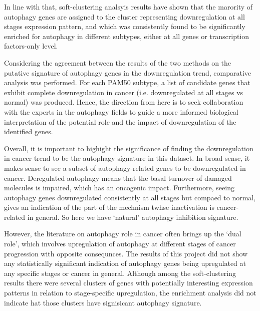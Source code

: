 In line with that, soft-clustering analsyis results have shown that the marority of autophagy genes are assigned to the cluster representing downregulation at all stages expression pattern, and which was consistently found to be significantly enriched for autophagy in different subtypes, either at  all genes or transcription factors-only level. 

Considering the agreement between the results of the two methods on the putative signature of autophagy genes in the downregulation trend, comparative analysis was performed. For each PAM50 subtype, a list of candidate genes that exhibit complete downregulation in cancer (i.e. downregulated at all stages vs normal) was produced. Hence, the direction from here is to seek collaboration with the experts in the autophagy fields to guide a more informed biological interpretation of the potential role and the impact of downregulation of the identified genes. 

Overall, it is important to highight the significance of finding the downregulation in cancer trend to be the autophagy signature in this dataset. In broad sense, it makes sense to see a subset of  autophagy-related genes to be downregulated in cancer. Deregulated autophagy means that the basal turnover of damaged molecules is impaired, which has an oncogenic impact. Furthermore, seeing autophagy genes downregulated consistently at all stages but compaed to normal, gives an indication of the part of the mechnism twhse inactivation is cancer-related in general. So here we have ‘natural’ autophagy inhibition signature.

However, the literature on autophagy role in cancer often brings up the ‘dual role’, which involves upregulation of  autophagy at different stages of cancer progression with opposite consequnces. The results of this project did not show any statistically significant indication of autophagy genes being upregulated at any specific stages or cancer in general. Although among the soft-clustering results there were several clusters of genes with potentially interesting expression patterns in relation to stage-specific upregulation,  the enrichment analysis did not indicate hat those clusters have signisicant autophagy signature.


